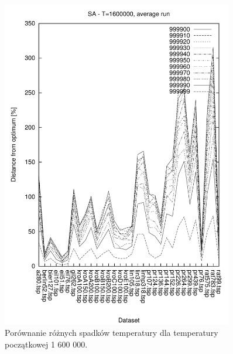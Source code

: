 \begin{figure}
\begin{center}
\includegraphics[width=0.9\textwidth]{wykresy/sa/sa_1600000_av}
\end{center}
\caption{Porównanie różnych spadków temperatury dla temperatury początkowej 1 600 000.}
\label{sa_1600000_av}
\end{figure}

